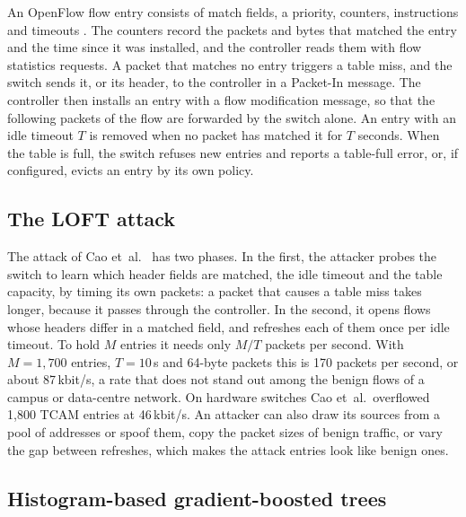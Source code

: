 \documentclass[conference]{IEEEtran}
\begin{document}
An OpenFlow flow entry consists of match fields, a priority, counters, instructions and timeouts
\cite{mckeown2008openflow}. The counters record the packets and bytes that matched the entry and the
time since it was installed, and the controller reads them with flow statistics requests. A packet that
matches no entry triggers a table miss, and the switch sends it, or its header, to the controller in a
Packet-In message. The controller then installs an entry with a flow modification message, so that the
following packets of the flow are forwarded by the switch alone. An entry with an idle timeout $T$ is
removed when no packet has matched it for $T$ seconds. When the table is full, the switch refuses new
entries and reports a table-full error, or, if configured, evicts an entry by its own policy.

\subsection{The LOFT attack}

The attack of Cao et~al.\ \cite{cao2017loft} has two phases. In the first, the attacker probes the switch
to learn which header fields are matched, the idle timeout and the table capacity, by timing its own
packets: a packet that causes a table miss takes longer, because it passes through the controller. In
the second, it opens flows whose headers differ in a matched field, and refreshes each of them once per
idle timeout. To hold $M$ entries it needs only $M/T$ packets per second. With $M = 1{,}700$ entries,
$T = 10$\,s and 64-byte packets this is 170 packets per second, or about 87\,kbit/s, a rate that does
not stand out among the benign flows of a campus or data-centre network. On hardware switches Cao
et~al.\ overflowed 1,800 TCAM entries at 46\,kbit/s. An attacker can also draw its sources from a pool of
addresses or spoof them, copy the packet sizes of benign traffic, or vary the gap between refreshes,
which makes the attack entries look like benign ones.

\subsection{Histogram-based gradient-boosted trees}
\end{document}
